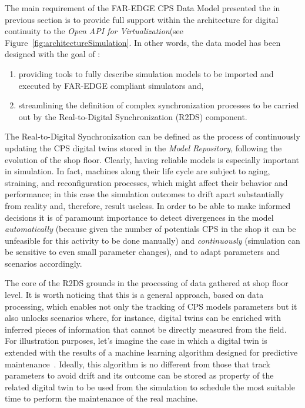 The main requirement of the FAR-EDGE CPS Data Model presented the in previous section is to provide full support within the architecture for digital continuity to the \textit{Open API for Virtualization}(see Figure~\ref{fig:architectureSimulation}. 
In other words, the data model has been designed with the goal of : 
\begin{enumerate}
\item providing tools to fully describe simulation models to be imported and executed by FAR-EDGE compliant simulators and,
\item streamlining the definition of complex synchronization processes to be carried out by the Real-to-Digital Synchronization (R2DS) component. 
\end{enumerate}

The Real-to-Digital Synchronization can be defined as the process of continuously updating the CPS digital twins stored in the \textit{Model Repository}, following the evolution of the shop floor. 
Clearly, having reliable models is especially important in simulation. 
In fact, machines along their life cycle are subject to aging, straining, and reconfiguration processes, which might affect their behavior and performance; in this case the simulation outcomes to drift apart substantially from reality and, therefore, result useless. 
In order to be able to make informed decisions it is of paramount importance to detect divergences in the model \textit{automatically} (because given the number of  potentials CPS in the shop it can be unfeasible for this activity to be done manually) and \textit{continuously} (simulation can be sensitive to even small parameter changes), and to adapt parameters and scenarios accordingly. 

The core of the R2DS grounds in the processing of data gathered at shop floor level. 
It is worth noticing that this is a general approach, based on data processing, which enables not only the tracking of CPS models parameters but it also unlocks scenarios where, for instance, digital twins can be enriched with inferred pieces of information that cannot be directly measured from the field. 
For illustration purposes, let's imagine the case in which a digital twin is extended with the results of a machine learning algorithm designed for predictive maintenance~\cite{daily2017predictive}. 
Ideally, this algorithm is no different from those that track parameters to avoid drift and its outcome can be stored as property of the related digital twin  to be used from the simulation to schedule the most suitable time to perform the maintenance of the real machine.  

